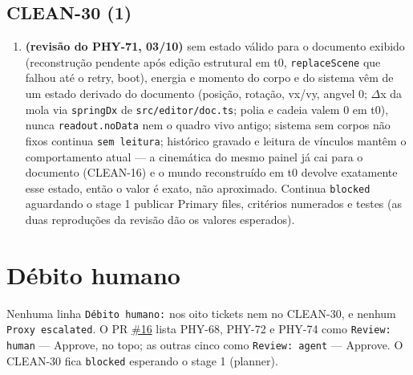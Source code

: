 \documentclass[11pt,a4paper]{article}
\begin{document}
{\subsection*{CLEAN-30 (1)}
\begin{enumerate}
  \item \textbf{(revisão do PHY-71, 03/10)} sem estado válido para o documento exibido (reconstrução pendente após edição estrutural em t0, \texttt{replaceScene} que falhou até o retry, boot), energia e momento do corpo e do sistema vêm de um estado derivado do documento (posição, rotação, vx/vy, angvel 0; $\Delta$x da mola via \texttt{springDx} de \texttt{src/editor/doc.ts}; polia e cadeia valem 0 em t0), nunca \texttt{readout.noData} nem o quadro vivo antigo; sistema sem corpos não fixos continua \texttt{sem leitura}; histórico gravado e leitura de vínculos mantêm o comportamento atual --- a cinemática do mesmo painel já cai para o documento (CLEAN-16) e o mundo reconstruído em t0 devolve exatamente esse estado, então o valor é exato, não aproximado. Continua \texttt{blocked} aguardando o stage 1 publicar Primary files, critérios numerados e testes (as duas reproduções da revisão dão os valores esperados).
\end{enumerate}
}

\section{Débito humano}

Nenhuma linha \texttt{Débito humano:} nos oito tickets nem no CLEAN-30, e
nenhum \texttt{Proxy escalated}. O PR
\href{https://github.com/Laginho/PhysiSyst/pull/16}{\#16} lista PHY-68, PHY-72 e
PHY-74 como \texttt{Review: human} --- Approve, no topo; as outras cinco como
\texttt{Review: agent} --- Approve. O CLEAN-30 fica \texttt{blocked} esperando o
stage 1 (planner).
\end{document}

